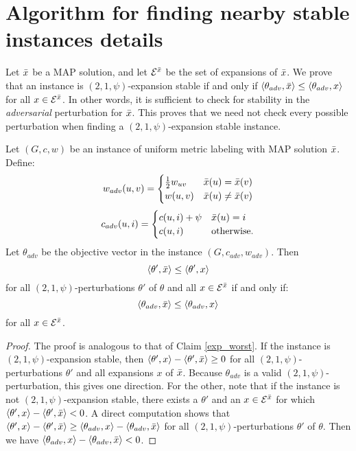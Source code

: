 \section{Algorithm for finding nearby stable instances details }
\label{sec:algorithm_details}
Let $\bar{x}$ be a MAP solution, and let $\mathcal{E}^{\bar{x}}$ be the set of expansions of $\bar{x}$.
We prove that an instance is $(2,1,\psi)$-expansion stable if and only if $\langle \theta_{adv},\bar{x}\rangle \le \langle \theta_{adv},x\rangle$ for all $x \in \mathcal{E}^{\bar{x}}$. In other words, it is sufficient to check for stability in the \emph{adversarial} perturbation for $\bar{x}$. 
This proves that we need not check every possible perturbation when finding a $(2,1,\psi)$-expansion stable instance.
\begin{claim}\label{claim:adv-enough}
Let $(G,c,w)$ be an instance of uniform metric labeling with MAP solution $\bar{x}$. Define:
\begin{equation*}
    w_{adv}(u,v) = \begin{cases}
    \frac{1}{2}w_{uv} & \bar{x}(u) = \bar{x}(v)\\
    w(u,v) & \bar{x}(u) \ne \bar{x}(v)
    \end{cases}
\end{equation*}
\begin{equation*}
    c_{adv}(u,i) = \begin{cases}
        c(u,i) + \psi & \bar{x}(u) = i\\
        c(u,i) & \text{otherwise.}
    \end{cases}
\end{equation*}
Let $\theta_{adv}$ be the objective vector in the instance $(G,c_{adv},w_{adv})$. Then
\[
\langle \theta',\bar{x}\rangle \le \langle \theta',x\rangle
\]
for all $(2,1,\psi)$-perturbations $\theta'$ of $\theta$ and all $x\in \mathcal{E}^{\bar{x}}$ if and only if:
\[
\langle \theta_{adv},\bar{x}\rangle \le \langle \theta_{adv},x\rangle
\]
for all $x\in \mathcal{E}^{\bar{x}}$.
\end{claim}
\begin{proof}
    The proof is analogous to that of Claim \ref{exp_worst}. If the instance is $(2,1,\psi)$-expansion stable, then $\langle \theta',x\rangle - \langle \theta',\bar{x}\rangle \ge 0$ for all $(2,1,\psi)$-perturbations $\theta'$ and all expansions $x$ of $\bar{x}$. Because $\theta_{adv}$ is a valid $(2,1,\psi)$-perturbation, this gives one direction. For the other, note that if the instance is not $(2,1,\psi)$-expansion stable, there exists a $\theta'$ and an $x\in\mathcal{E}^{\bar{x}}$ for which $\langle \theta',x\rangle - \langle \theta',\bar{x}\rangle < 0$. A direct computation shows that $\langle \theta',x\rangle - \langle \theta',\bar{x}\rangle \ge \langle \theta_{adv},x\rangle - \langle \theta_{adv},\bar{x}\rangle$ for all $(2,1,\psi)$-perturbations $\theta'$ of $\theta$. Then we have $\langle \theta_{adv},x\rangle - \langle \theta_{adv},\bar{x}\rangle < 0$.
\end{proof}
